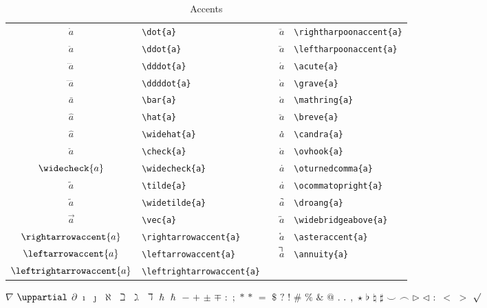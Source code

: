 \documentclass[captions=tableheading]{scrartcl}
\begin{document}
\begin{table}
  \caption{Accents}
  \label{tab:accents}
  \centering
  \begin{tabular}[c]{clp{1em}cl}
    \toprule
    $\dot{a}$ & \verb|\dot{a}| & &
    $\rightharpoonaccent{a}$ & \verb|\rightharpoonaccent{a}| \\
    $\ddot{a}$ & \verb|\ddot{a}| & &
    $\leftharpoonaccent{a}$ & \verb|\leftharpoonaccent{a}| \\
    $\dddot{a}$ & \verb|\dddot{a}| & &
    $\acute{a}$ & \verb|\acute{a}| \\
    $\ddddot{a}$ & \verb|\ddddot{a}| & &
    $\grave{a}$ & \verb|\grave{a}| \\
    $\bar{a}$ & \verb|\bar{a}| & &
    $\mathring{a}$ & \verb|\mathring{a}| \\
    \addlinespace
    $\hat{a}$ & \verb|\hat{a}| & &
    $\breve{a}$ & \verb|\breve{a}| \\
    $\widehat{a}$ & \verb|\widehat{a}| & &
    $\candra{a}$ & \verb|\candra{a}| \\
    $\check{a}$ & \verb|\check{a}| & &
    $\ovhook{a}$ & \verb|\ovhook{a}| \\
    $\widecheck{a}$ & \verb|\widecheck{a}| & &
    $\oturnedcomma{a}$ & \verb|\oturnedcomma{a}| \\
    $\tilde{a}$ & \verb|\tilde{a}| & &
    $\ocommatopright{a}$ & \verb|\ocommatopright{a}| \\
    $\widetilde{a}$ & \verb|\widetilde{a}| & &
    $\droang{a}$ & \verb|\droang{a}| \\
    \addlinespace
    $\vec{a}$ & \verb|\vec{a}| & &
    $\widebridgeabove{a}$ & \verb|\widebridgeabove{a}| \\
    $\rightarrowaccent{a}$ & \verb|\rightarrowaccent{a}| & &
    $\asteraccent{a}$ & \verb|\asteraccent{a}| \\
    $\leftarrowaccent{a}$ & \verb|\leftarrowaccent{a}| & &
    $\annuity{a}$ & \verb|\annuity{a}| \\
    $\leftrightarrowaccent{a}$ & \verb|\leftrightarrowaccent{a}| & &
    & \\
    \bottomrule
  \end{tabular}
\end{table}


$\nabla$
$\uppartial$
$\partial$
$\imath$
$\jmath$
$\aleph$
$\beth$
$\gimel$
$\daleth$
$\hbar$
$\hslash$
$-$
$+$
$\pm$
$\mp$
$:$
$;$
$*$
$\ast$
$=$
$\mathdollar$
$?$
$!$
$\#$
$\%$
$\&$
$@$
$.$
$\ldotp$
$,$
$\star$
$\flat$
$\natural$
$\sharp$
$\smile$
$\frown$
$\triangleright$
$\triangleleft$
$\colon$
$<$
$>$
$\surd$
\end{document}
